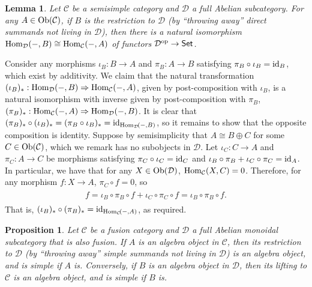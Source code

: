 \documentclass[12pt, reqno]{amsart}
\numberwithin{equation}{section}
\theoremstyle{plainspace}
\newtheorem{lemma}[theorem]{Lemma}
\newtheorem{proposition}[theorem]{Proposition}
\theoremstyle{definitionspace}
\theoremstyle{remarkspace}
\renewenvironment{proof}{{\noindent\textbf{Proof.}}}{\null\hfill\qedsymbol}
\newcommand{\id}{\textup{id}}
\newcommand{\mathcat}[1]{\mathcal{#1}}
\newcommand{\Ob}{\textup{Ob}}
\newcommand{\Hom}[2][]{
	\ifthenelse{\equal{#2}{}}
		{\textup{Hom}_{#1}}
		{\textup{Hom}_{#1}\!\left(#2\right)}
}
\newcommand{\opcat}[1]{{#1}^{\textup{op}}}
\newcommand{\textcat}[1]{\textup{\textsf{#1}}}
\begin{document}
\begin{lemma}\label{lem:hom_isomorphism}
Let $\mathcat{C}$ be a semisimple category and $\mathcat{D}$ a full Abelian subcategory. For any $A \in \Ob(\mathcat{C})$, if $B$ is the restriction to $\mathcat{D}$ (by ``throwing away'' direct summands not living in $\mathcat{D}$), then there is a natural isomorphism $\Hom[\mathcat{D}]{-, B} \cong \Hom[\mathcat{C}]{-, A}$ {\em of functors $\opcat{\mathcat{D}} \to \textcat{Set}$}.
\end{lemma}
\leavevmode\newline
\begin{proof}
\noindent Consider any morphisms $\iota_B : B \to A$ and $\pi_B : A \to B$ satisfying $\pi_B \circ \iota_B = \id_B$, which exist by additivity. We claim that the natural transformation $(\iota_B)_{*} : \Hom[\mathcat{D}]{-, B} \Rightarrow \Hom[\mathcat{C}]{-, A}$, given by post-composition with $\iota_B$, is a natural isomorphism with inverse given by post-composition with $\pi_B$, $(\pi_B)_{*} : \Hom[\mathcat{C}]{-, A} \Rightarrow \Hom[\mathcat{D}]{-, B}$. It is clear that $(\pi_B)_{*} \circ (\iota_B)_{*} = (\pi_B \circ \iota_B)_{*} = \id_{\Hom[\mathcat{D}]{-, B}}$, so it remains to show that the opposite composition is identity. Suppose by semisimplicity that $A \cong B \oplus C$ for some $C \in \Ob(\mathcat{C})$, which we remark has no subobjects in $\mathcat{D}$. Let $\iota_C : C \to A$ and $\pi_C : A \to C$ be morphisms satisfying $\pi_C \circ \iota_C = \id_C$ and $\iota_B \circ \pi_B + \iota_C \circ \pi_C = \id_A$. In particular, we have that for any $X \in \Ob(\mathcat{D})$, $\Hom[\mathcat{C}]{X, C} = 0$. Therefore, for any morphism $f : X \to A$, $\pi_C \circ f = 0$, so
\begin{align*}
\begin{split}
f = \iota_B \circ \pi_B \circ f + \iota_C \circ \pi_C \circ f = \iota_B \circ \pi_B \circ f.
\end{split}
\end{align*}
\noindent That is, $(\iota_B)_{*} \circ (\pi_B)_{*} = \id_{\Hom[\mathcat{C}]{-, A}}$, as required.
\end{proof}
\newline

\begin{proposition}\label{prop:algebra_restriction_inclusion}
Let $\mathcat{C}$ be a fusion category and $\mathcat{D}$ a full Abelian monoidal subcategory that is also fusion. If $A$ is an algebra object in $\mathcat{C}$, then its restriction to $\mathcat{D}$ (by ``throwing away'' simple summands not living in $\mathcat{D}$) is an algebra object, and is simple if $A$ is. Conversely, if $B$ is an algebra object in $\mathcat{D}$, then its lifting to $\mathcat{C}$ is an algebra object, and is simple if $B$ is.
\end{proposition}
\leavevmode
\end{document}
